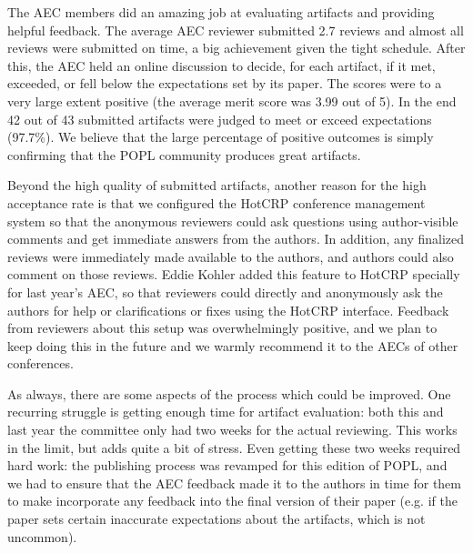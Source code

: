 
%
The AEC members did an amazing job at evaluating artifacts and
providing helpful feedback.
%
The average AEC reviewer submitted 2.7 reviews and almost all reviews
 were submitted on time, a big achievement given the tight schedule.
%
After this, the AEC held an online discussion to decide, for each
artifact, if it met, exceeded, or fell below the expectations set by
its paper.
%
The scores were to a very large extent positive (the average merit
score was 3.99 out of 5).
%
In the end 42 out of 43 submitted artifacts were judged to meet or
exceed expectations (97.7\%).
%
We believe that the large percentage of positive outcomes is simply
confirming that the POPL community produces great artifacts.

Beyond the high quality of submitted artifacts, another reason for the
high acceptance rate is that we configured the HotCRP conference
management system so that the anonymous reviewers could ask questions
using author-visible comments and get immediate answers from the
authors. In addition, any finalized reviews were immediately made
available to the authors, and authors could also comment on those
reviews. Eddie Kohler added this feature to HotCRP specially for last
year's AEC, so that reviewers could directly and anonymously ask the
authors for help or clarifications or fixes using the HotCRP
interface. Feedback from reviewers about this setup was overwhelmingly
positive, and we plan to keep doing this in the future and we warmly
recommend it to the AECs of other conferences.

As always, there are some aspects of the process which could be
improved. One recurring struggle is getting enough time for artifact
evaluation: both this and last year the committee only had two weeks
for the actual reviewing. This works in the limit, but adds quite a
bit of stress. Even getting these two weeks required hard work: the
publishing process was revamped for this edition of POPL, and we had
to ensure that the AEC feedback made it to the authors in time for
them to make incorporate any feedback into the final version of their
paper (e.g. if the paper sets certain inaccurate expectations about
the artifacts, which is not uncommon).

